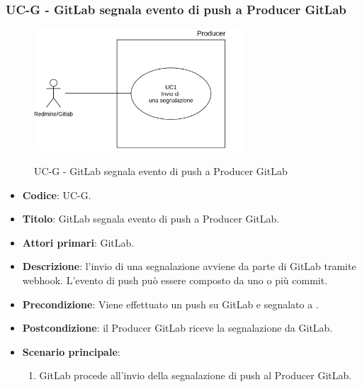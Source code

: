 \subsubsection{UC\theuccount-G - GitLab segnala evento di push a Producer GitLab}
	\begin{figure}[H]
		\centering
		\includegraphics[width=0.7\textwidth]{img/UC1.png}\\
		\caption{UC\theuccount-G - GitLab segnala evento di push a Producer GitLab}
	\end{figure}
	\begin{itemize}
		\item \textbf{Codice}: UC\theuccount-G.
		\item \textbf{Titolo}: GitLab segnala evento di push a Producer GitLab.
		\item \textbf{Attori primari}: GitLab.
		\item \textbf{Descrizione}: l'invio di una segnalazione avviene da parte di GitLab tramite webhook. L'evento di
		push può essere composto da uno o più commit.
		\item \textbf{Precondizione}: Viene effettuato un push su GitLab e segnalato a \progetto.
		\item \textbf{Postcondizione}: il Producer GitLab riceve la segnalazione da GitLab.
		\item \textbf{Scenario principale}: 
		\begin{enumerate}
			\item GitLab procede all'invio della segnalazione di push al Producer GitLab.
		\end{enumerate}
		
	\end{itemize}